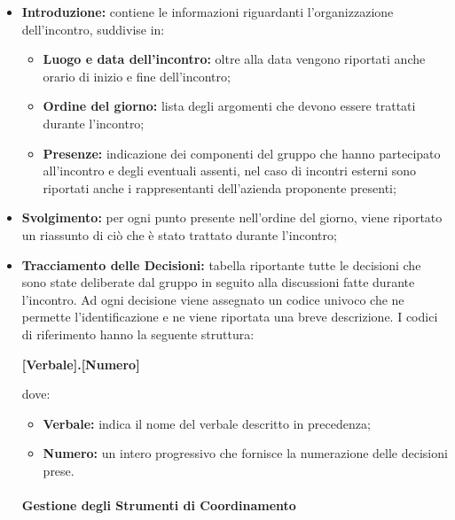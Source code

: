 				\begin{itemize}
					\item \textbf{Introduzione:} contiene le informazioni riguardanti l'organizzazione dell'incontro, suddivise in:
					\begin{itemize}
						\item \textbf{Luogo e data dell'incontro:} oltre alla data vengono riportati anche orario di inizio e fine dell'incontro;
						\item \textbf{Ordine del giorno:} lista degli argomenti che devono essere trattati durante l'incontro;
						\item \textbf{Presenze:} indicazione dei componenti del gruppo che hanno partecipato all'incontro e degli eventuali assenti, nel caso di incontri esterni sono riportati anche i rappresentanti dell'azienda proponente presenti;
					\end{itemize}
					\item \textbf{Svolgimento:} per ogni punto presente nell'ordine del giorno, viene riportato un riassunto di ciò che è stato trattato durante l'incontro;
					\item \textbf{Tracciamento delle Decisioni:} tabella riportante tutte le decisioni che sono state deliberate dal gruppo in seguito alla discussioni fatte durante l'incontro. Ad ogni decisione viene assegnato un codice univoco che ne permette l'identificazione e ne viene riportata una breve descrizione. I codici di riferimento hanno la seguente struttura:
					\centerline{\textbf{[Verbale].[Numero]}}
					dove:
					\begin{itemize}
						\item \textbf{Verbale:} indica il nome del verbale descritto in precedenza;
						\item \textbf{Numero:} un intero progressivo che fornisce la numerazione delle decisioni prese.
				\end{itemize}
		
		\paragraph{Gestione degli Strumenti di Coordinamento}
		

\end{itemize}

